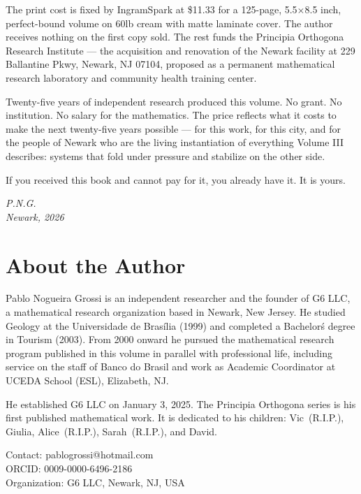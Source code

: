 \documentclass[12pt, oneside]{book}
\theoremstyle{plain}
\theoremstyle{definition}
\theoremstyle{remark}
\begin{document}
\noindent The print cost is fixed by IngramSpark at \$11.33 for
a 125-page, 5.5$\times$8.5 inch, perfect-bound volume on 60lb cream
with matte laminate cover. The author receives nothing on the
first copy sold. The rest funds the
Principia Orthogona Research Institute ---
the acquisition and renovation of the Newark facility at
229 Ballantine Pkwy, Newark, NJ 07104,
proposed as a permanent mathematical research laboratory
and community health training center.

\vspace{0.4cm}

\noindent Twenty-five years of independent research produced this volume.
No grant. No institution. No salary for the mathematics.
The price reflects what it costs to make the next twenty-five
years possible --- for this work, for this city, and for
the people of Newark who are the living instantiation
of everything Volume III describes:
systems that fold under pressure and stabilize on the other side.

\vspace{0.4cm}

\noindent If you received this book and cannot pay for it,
you already have it. It is yours.

\vspace{1.2cm}

\begin{flushright}
\textit{P.N.G.}\\[0.2em]
\textit{Newark, 2026}
\end{flushright}

\newpage
\chapter*{About the Author}

Pablo Nogueira Grossi is an independent researcher and the founder of G6 LLC,
a mathematical research organization based in Newark, New Jersey. He studied
Geology at the Universidade de Bras\'ilia (1999) and completed a Bachelor\'s
degree in Tourism (2003). From 2000 onward he pursued the mathematical research
program published in this volume in parallel with professional life, including
service on the staff of Banco do Brasil and work as Academic Coordinator at
UCEDA School (ESL), Elizabeth, NJ.

He established G6 LLC on January 3, 2025. The Principia Orthogona series is
his first published mathematical work. It is dedicated to his children:
Vic~(R.I.P.), Giulia, Alice~(R.I.P.), Sarah~(R.I.P.), and David.

\bigskip
\noindent Contact: pablogrossi@hotmail.com\\
ORCID: 0009-0000-6496-2186\\
Organization: G6 LLC, Newark, NJ, USA

\newpage
\thispagestyle{empty}
\mbox{}
\end{document}
